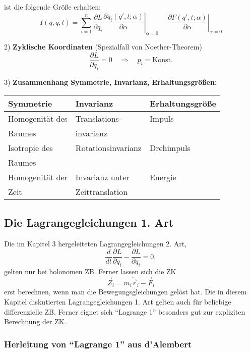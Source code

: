 \documentclass[10pt, letterpaper]{article}
\begin{document}
ist die folgende Größe erhalten:
\[I(q,\dot{q},t) = \sum_{i=1}^n \frac{\partial L}{\partial \dot{q_i}} \left.\frac{\partial q_i(q',t;\alpha)}{\partial \alpha}\right|_{\alpha=0} - \left.\frac{\partial F(q',t;\alpha)}{\partial \alpha}\right|_{\alpha=0}\]

2) \textbf{Zyklische Koordinaten} (Spezialfall von Noether-Theorem)
\[\frac{\partial L}{\partial q_i} = 0 \quad \Rightarrow \quad p_i = \text{Konst.}\]

3) \textbf{Zusammenhang Symmetrie, Invarianz, Erhaltungsgrößen:}

\begin{tabular}{|l|l|l|}
\hline
Symmetrie & Invarianz & Erhaltungsgröße \\
\hline
Homogenität des & Translations- & Impuls \\
Raumes & invarianz & \\
\hline
Isotropie des & Rotationsinvarianz & Drehimpuls \\
Raumes & & \\
\hline
Homogenität der & Invarianz unter & Energie \\
Zeit & Zeittranslation & \\
\hline
\end{tabular}



\pagebreak


\subsection{Die Lagrangegleichungen 1. Art}


Die im Kapitel 3 hergeleiteten Lagrangegleichungen 2. Art,
\[\frac{d}{dt}\frac{\partial L}{\partial \dot{q}_i} - \frac{\partial L}{\partial q_i} = 0,\]
gelten nur bei holonomen ZB. Ferner lassen sich die ZK
\[\vec{Z}_i = m_i\ddot{\vec{r}}_i-\vec{F}_i\] erst berechnen, wenn man die Bewegungsgleichungen gelöst hat. Die in diesem Kapitel diskutierten Lagrangegleichungen 1. Art gelten auch für beliebige differenzielle ZB. Ferner eignet sich ``Lagrange 1'' besonders gut zur expliziten Berechnung der ZK.

\subsubsection{Herleitung von ``Lagrange 1'' aus d'Alembert}
\end{document}

